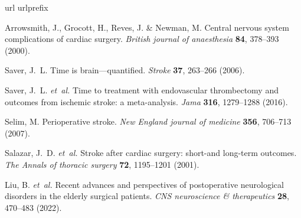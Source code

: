 \documentclass[11pt]{article}
\begin{document}
\begin{thebibliography}{10}
  \expandafter\ifx\csname url\endcsname\relax
  \def\url#1{\burl{#1}}\fi
  \expandafter\ifx\csname urlprefix\endcsname\relax\def\urlprefix{URL }\fi
  \providecommand{\bibinfo}[2]{#2}
  \providecommand{\eprint}[2][]{\url{#2}}
  \providecommand{\doi}[1]{\url{https://doi.org/#1}}
  \providecommand{\bibcommenthead}{}
  \bibcommenthead

  \bibinfo{author}{Arrowsmith, J.}, \bibinfo{author}{Grocott, H.},
  \bibinfo{author}{Reves, J.} \& \bibinfo{author}{Newman, M.}
  \newblock \bibinfo{title}{Central nervous system complications of cardiac
  surgery.}
  \newblock \emph{\bibinfo{journal}{British journal of anaesthesia}}
  \textbf{\bibinfo{volume}{84}}, \bibinfo{pages}{378--393}
  (\bibinfo{year}{2000}).

  \bibinfo{author}{Saver, J.~L.}
  \newblock \bibinfo{title}{Time is brain—quantified}.
  \newblock \emph{\bibinfo{journal}{Stroke}} \textbf{\bibinfo{volume}{37}},
  \bibinfo{pages}{263--266} (\bibinfo{year}{2006}).

  \bibinfo{author}{Saver, J.~L.} \emph{et~al.}
  \newblock \bibinfo{title}{Time to treatment with endovascular thrombectomy and
  outcomes from ischemic stroke: a meta-analysis}.
  \newblock \emph{\bibinfo{journal}{Jama}} \textbf{\bibinfo{volume}{316}},
  \bibinfo{pages}{1279--1288} (\bibinfo{year}{2016}).

  \bibinfo{author}{Selim, M.}
  \newblock \bibinfo{title}{Perioperative stroke}.
  \newblock \emph{\bibinfo{journal}{New England journal of medicine}}
  \textbf{\bibinfo{volume}{356}}, \bibinfo{pages}{706--713}
  (\bibinfo{year}{2007}).

  \bibinfo{author}{Salazar, J.~D.} \emph{et~al.}
  \newblock \bibinfo{title}{Stroke after cardiac surgery: short-and long-term
  outcomes}.
  \newblock \emph{\bibinfo{journal}{The Annals of thoracic surgery}}
  \textbf{\bibinfo{volume}{72}}, \bibinfo{pages}{1195--1201}
  (\bibinfo{year}{2001}).

  \bibinfo{author}{Liu, B.} \emph{et~al.}
  \newblock \bibinfo{title}{Recent advances and perspectives of postoperative
  neurological disorders in the elderly surgical patients}.
  \newblock \emph{\bibinfo{journal}{CNS neuroscience \& therapeutics}}
  \textbf{\bibinfo{volume}{28}}, \bibinfo{pages}{470--483}
  (\bibinfo{year}{2022}).


\end{thebibliography}
\end{document}
